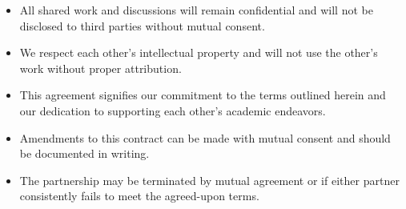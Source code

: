 \documentclass{contract}
\begin{document}
\begin{itemize}
    \item All shared work and discussions will remain confidential and will not be disclosed to third parties without mutual consent.
    \item We respect each other's intellectual property and will not use the other's work without proper attribution.
\end{itemize}

\begin{itemize}
    \item This agreement signifies our commitment to the terms outlined herein and our dedication to supporting each other's academic endeavors.
    \item Amendments to this contract can be made with mutual consent and should be documented in writing.
    \item The partnership may be terminated by mutual agreement or if either partner consistently fails to meet the agreed-upon terms.
\end{itemize}

\end{document}
